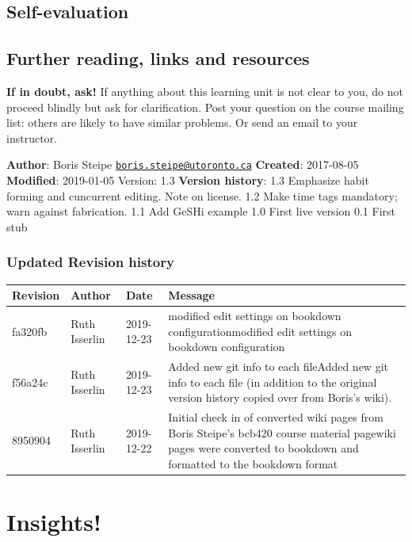 \documentclass[]{book}
\let\BeginKnitrBlock\begin \let\EndKnitrBlock\end
\begin{document}
\section{Self-evaluation}\label{self-evaluation-1}

\section{Further reading, links and
resources}\label{further-reading-links-and-resources-1}

\textbf{If in doubt, ask!} If anything about this learning unit is not
clear to you, do not proceed blindly but ask for clarification. Post
your question on the course mailing list: others are likely to have
similar problems. Or send an email to your instructor.

\BeginKnitrBlock{rmd-original-history}
\textbf{Author}: Boris Steipe
\href{mailto:boris.steipe@utoronto.ca}{\nolinkurl{boris.steipe@utoronto.ca}}
\textbf{Created}: 2017-08-05 \textbf{Modified}: 2019-01-05 Version: 1.3
\textbf{Version history}: 1.3 Emphasize habit forming and cuncurrent
editing. Note on license. 1.2 Make time tags mandatory; warn against
fabrication. 1.1 Add GeSHi example 1.0 First live version 0.1 First stub
\EndKnitrBlock{rmd-original-history}

\subsection{Updated Revision history}\label{updated-revision-history-1}

\begin{tabular}{l|l|l|l}
\hline
Revision & Author & Date & Message\\
\hline
fa320fb & Ruth Isserlin & 2019-12-23 & modified edit settings on bookdown configurationmodified edit settings on bookdown configuration\\
\hline
f56a24c & Ruth Isserlin & 2019-12-23 & Added new git info to each fileAdded new git info to each file (in addition to the original version history copied over from Boris's wiki).\\
\hline
8950904 & Ruth Isserlin & 2019-12-22 & Initial check in of converted wiki pages from Boris Steipe's bcb420 course material pagewiki pages were converted to bookdown and formatted to the bookdown format\\
\hline
\end{tabular}

\chapter{Insights!}\label{insights}
\end{document}

